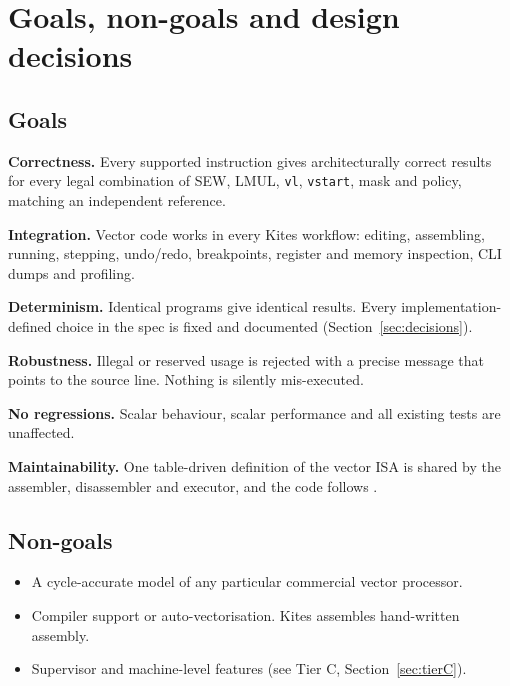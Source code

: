 \documentclass[11pt]{article}
\begin{document}
\section{Goals, non-goals and design decisions}\label{sec:goals}

\subsection{Goals}
\begin{description}[leftmargin=1.2cm,style=sameline,font=\sffamily\bfseries\color{kblue}]
\item[G1] \textbf{Correctness.} Every supported instruction gives architecturally correct results for
  every legal combination of SEW, LMUL, \texttt{vl}, \texttt{vstart}, mask and policy, matching an
  independent reference.
\item[G2] \textbf{Integration.} Vector code works in every Kites workflow: editing, assembling,
  running, stepping, undo/redo, breakpoints, register and memory inspection, CLI dumps and profiling.
\item[G3] \textbf{Determinism.} Identical programs give identical results. Every
  implementation-defined choice in the spec is fixed and documented (Section~\ref{sec:decisions}).
\item[G4] \textbf{Robustness.} Illegal or reserved usage is rejected with a precise message that
  points to the source line. Nothing is silently mis-executed.
\item[G5] \textbf{No regressions.} Scalar behaviour, scalar performance and all existing tests are
  unaffected.
\item[G6] \textbf{Maintainability.} One table-driven definition of the vector ISA is shared by the
  assembler, disassembler and executor, and the code follows .
\end{description}

\subsection{Non-goals}
\begin{itemize}
\item A cycle-accurate model of any particular commercial vector processor.
\item Compiler support or auto-vectorisation. Kites assembles hand-written assembly.
\item Supervisor and machine-level features (see Tier C, Section~\ref{sec:tierC}).
\end{itemize}
\end{document}
